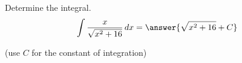 \documentclass{ximera}
\author{Jason Miller}
\begin{document}
\begin{exercise}
Determine the integral.
\[
\int \frac{x}{\sqrt{x^{2}+16}} \d x=\answer{ \sqrt{x^{2}+16} + C }
\]

(use $C$ for the constant of integration)


\end{exercise}
\end{document}

